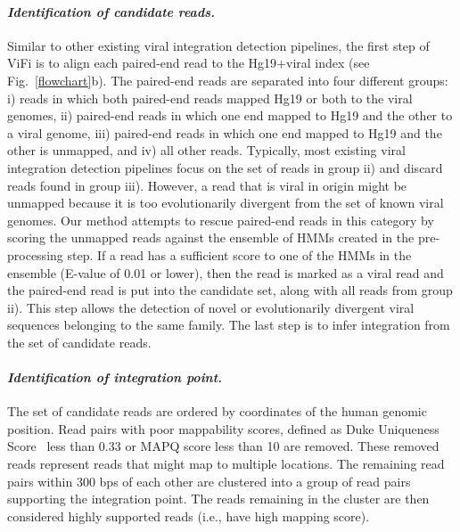 \documentclass[10pt]{article}
\begin{document}
\paragraph{\emph{Identification of candidate reads.}} Similar to other existing viral integration detection pipelines, the first step of ViFi is to align each paired-end read to the Hg19+viral index (see Fig.~\ref{flowchart}b).  The paired-end reads are separated into four different groups: i) reads in which both paired-end reads mapped Hg19 or both to the viral genomes, ii) paired-end reads in which one end mapped to Hg19 and the other to a viral genome, iii) paired-end reads in which one end mapped to Hg19 and the other is unmapped, and iv) all other reads.  Typically, most existing viral integration detection pipelines focus on the set of reads in group ii) and discard reads found in group iii).  However, a read that is viral in origin might be unmapped because it is too evolutionarily divergent from the set of known viral genomes.  Our method attempts to rescue paired-end reads in this category by scoring the unmapped reads against the ensemble of HMMs created in the pre-processing step.  If a read has a sufficient score to one of the HMMs in the ensemble (E-value of 0.01 or lower), then the read is marked as a viral read and the paired-end read is put into the candidate set, along with all reads from group ii).  This step allows the detection of novel or evolutionarily divergent viral sequences belonging to the same family.  The last step is to infer integration from the set of candidate reads.  

\paragraph{\emph{Identification of integration point.}}  The set of candidate reads are ordered by coordinates of the human genomic position.  Read pairs with poor mappability scores, defined as Duke Uniqueness Score~\cite{unknown} less than 0.33 or MAPQ score less than 10 are removed.  These removed reads represent reads that might map to multiple locations.  The remaining read pairs within 300 bps of each other are clustered into a group of read pairs supporting the integration point.  The reads remaining in the cluster are then considered highly supported reads (i.e., have high mapping score).  

\end{document}
